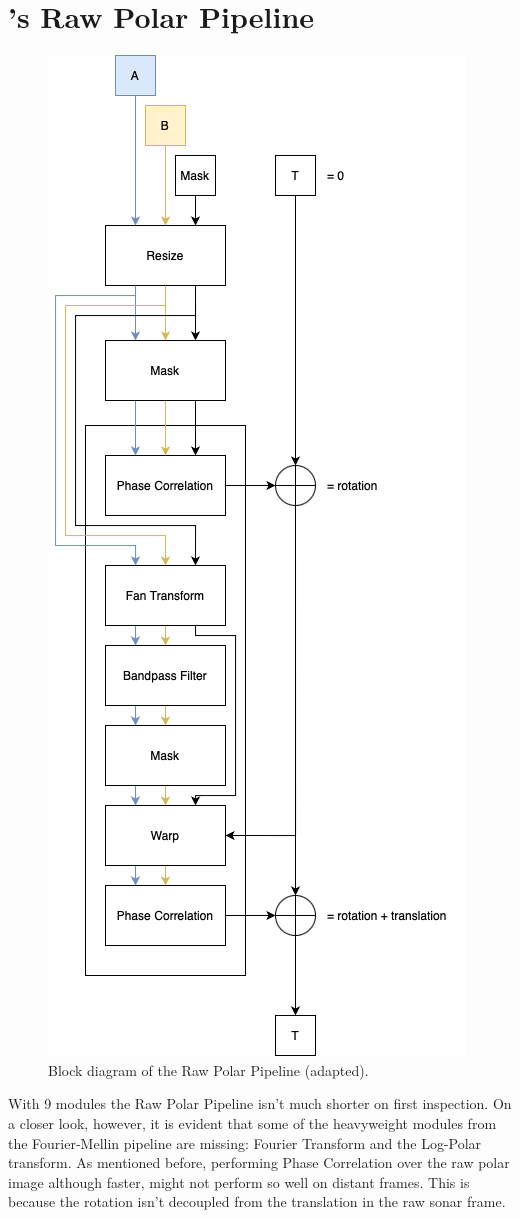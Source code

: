 \section{\citeauthor{Hurtos2015}'s Raw Polar Pipeline}
\begin{figure}[H] 
  \centering
  \includegraphics[width=.7\textwidth]{figures/pc_pipeline.png}
  \caption{Block diagram of the Raw Polar Pipeline (adapted).}
  \label{fig:pcpipeline}
\end{figure}

With 9 modules the Raw Polar Pipeline isn't much shorter on first inspection. On a closer look, however, it is evident that some of the heavyweight modules from the Fourier-Mellin pipeline are missing: Fourier Transform and the Log-Polar transform. As mentioned before, performing Phase Correlation over the raw polar image although faster, might not perform so well on distant frames. This is because the rotation isn't decoupled from the translation in the raw sonar frame. 

